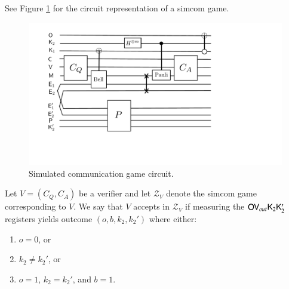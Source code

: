 \noindent See Figure \ref{fig:simcom} for the circuit representation of a simcom game.

\begin{figure}[H]
\begin{center}
\includegraphics[width=5in]{graphics/simcom.pdf}
\end{center}
\caption{Simulated communication game circuit.}
\label{fig:simcom}
\end{figure}

Let $V = (C_Q,C_A)$ be a verifier and let $\mathscr{Z}_V$ denote the simcom game corresponding to $V$. We say that $V$ accepts in $\mathscr{Z}_V$ if measuring the ${\mathsf{O}} {\mathsf{V}}_{out} {\mathsf{K}}_2 {\mathsf{K}}_2'$ registers yields outcome $(o,b,k_2,k_2')$ where either:
\begin{enumerate}
	\item $o = 0$, or
	\item $k_2 \neq k_2'$, or
	\item $o = 1$, $k_2 = k_2'$, and $b = 1$.
\end{enumerate}

